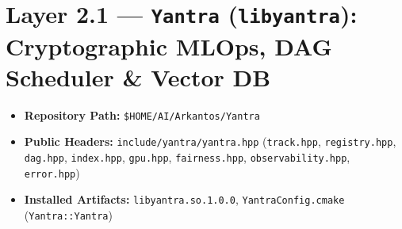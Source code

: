 \documentclass[11pt,a4paper]{article}
\begin{document}
\section{Layer 2.1 --- \texttt{Yantra} (\texttt{libyantra}): Cryptographic MLOps, DAG Scheduler \& Vector DB}

\begin{itemize}[leftmargin=1.5em,itemsep=1pt]
  \item \textbf{Repository Path:} \texttt{\$HOME/AI/Arkantos/Yantra}
  \item \textbf{Public Headers:} \texttt{include/yantra/yantra.hpp} (\texttt{track.hpp}, \texttt{registry.hpp}, \texttt{dag.hpp}, \texttt{index.hpp}, \texttt{gpu.hpp}, \texttt{fairness.hpp}, \texttt{observability.hpp}, \texttt{error.hpp})
  \item \textbf{Installed Artifacts:} \texttt{libyantra.so.1.0.0}, \texttt{YantraConfig.cmake} (\texttt{Yantra::Yantra})
\end{itemize}
\end{document}
